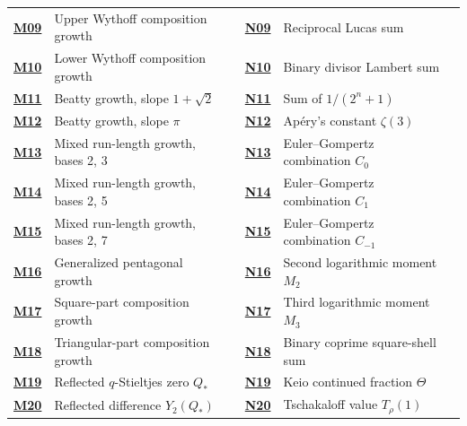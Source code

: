 \documentclass[11pt,a4paper]{article}
\theoremstyle{definition}
\theoremstyle{remark}
\begin{document}
{\begin{tabularx}{\textwidth}{@{}l>{\raggedright\arraybackslash}Xrl>{\raggedright\arraybackslash}Xr@{}}
\hyperlink{cat-M09}{\textbf{M09}} & Upper Wythoff composition growth & \pageref*{page:M09} & \hyperlink{cat-N09}{\textbf{N09}} & Reciprocal Lucas sum & \pageref*{page:N09} \\
\hyperlink{cat-M10}{\textbf{M10}} & Lower Wythoff composition growth & \pageref*{page:M10} & \hyperlink{cat-N10}{\textbf{N10}} & Binary divisor Lambert sum & \pageref*{page:N10} \\
\hyperlink{cat-M11}{\textbf{M11}} & Beatty growth, slope $1+\sqrt2$ & \pageref*{page:M11} & \hyperlink{cat-N11}{\textbf{N11}} & Sum of $1/(2^n+1)$ & \pageref*{page:N11} \\
\hyperlink{cat-M12}{\textbf{M12}} & Beatty growth, slope $\pi$ & \pageref*{page:M12} & \hyperlink{cat-N12}{\textbf{N12}} & Ap\'ery's constant $\zeta(3)$ & \pageref*{page:N12} \\
\hyperlink{cat-M13}{\textbf{M13}} & Mixed run-length growth, bases 2, 3 & \pageref*{page:M13} & \hyperlink{cat-N13}{\textbf{N13}} & Euler--Gompertz combination $C_0$ & \pageref*{page:N13} \\
\hyperlink{cat-M14}{\textbf{M14}} & Mixed run-length growth, bases 2, 5 & \pageref*{page:M14} & \hyperlink{cat-N14}{\textbf{N14}} & Euler--Gompertz combination $C_1$ & \pageref*{page:N14} \\
\hyperlink{cat-M15}{\textbf{M15}} & Mixed run-length growth, bases 2, 7 & \pageref*{page:M15} & \hyperlink{cat-N15}{\textbf{N15}} & Euler--Gompertz combination $C_{-1}$ & \pageref*{page:N15} \\
\hyperlink{cat-M16}{\textbf{M16}} & Generalized pentagonal growth & \pageref*{page:M16} & \hyperlink{cat-N16}{\textbf{N16}} & Second logarithmic moment $M_2$ & \pageref*{page:N16} \\
\hyperlink{cat-M17}{\textbf{M17}} & Square-part composition growth & \pageref*{page:M17} & \hyperlink{cat-N17}{\textbf{N17}} & Third logarithmic moment $M_3$ & \pageref*{page:N17} \\
\hyperlink{cat-M18}{\textbf{M18}} & Triangular-part composition growth & \pageref*{page:M18} & \hyperlink{cat-N18}{\textbf{N18}} & Binary coprime square-shell sum & \pageref*{page:N18} \\
\hyperlink{cat-M19}{\textbf{M19}} & Reflected $q$-Stieltjes zero $Q_*$ & \pageref*{page:M19} & \hyperlink{cat-N19}{\textbf{N19}} & Keio continued fraction $\Theta$ & \pageref*{page:N19} \\
\hyperlink{cat-M20}{\textbf{M20}} & Reflected difference $Y_2(Q_*)$ & \pageref*{page:M20} & \hyperlink{cat-N20}{\textbf{N20}} & Tschakaloff value $T_\rho(1)$ & \pageref*{page:N20} \\

\end{tabularx}}
\end{document}
